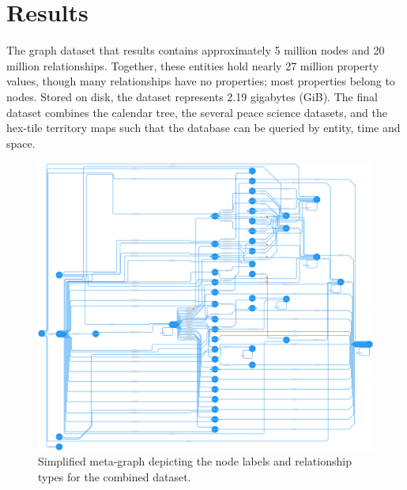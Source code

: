 \documentclass[runningheads]{llncs}
\begin{document}
\section{Results\label{results}} 
The graph dataset that results contains approximately 5 million nodes and 20 million relationships. 
Together, these entities hold nearly 27 million property values, though many relationships have no properties; most properties belong to nodes. 
Stored on disk, the dataset represents 2.19 gigabytes (GiB). 
The final dataset combines the calendar tree, the several peace science datasets, and the hex-tile territory maps such that the database can be queried by entity, time and space. 

\begin{figure}
\includegraphics[width=\textwidth]{validationMetaData_yFiles.png}
\caption{Simplified meta-graph depicting the node labels and relationship types for the combined dataset.} \label{metagraph}
\end{figure}
\end{document}
